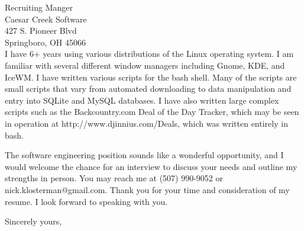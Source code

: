\documentclass{letter} %
\begin{document}
\begin{letter}{Recruiting Manger \\
Caesar Creek Software \\
427 S. Pioneer Blvd \\
Springboro, OH 45066 \\
}
\noindent 
I have 6+ years using various distributions of the Linux operating system. 
I am familiar with several different window managers including Gnome, KDE, and IceWM.
I have written various scripts for the bash shell.  
Many of the scripts are small scripts that vary from automated downloading to data manipulation and entry into SQLite and MySQL databases. 
I have also written large complex scripts such as the Backcountry.com Deal of the Day Tracker, which may be seen in operation at http://www.djinnius.com/Deals,  which was written entirely in bash.


 
\noindent 
The software engineering position sounds like a wonderful opportunity, and I would welcome the chance for an interview to discuss your needs and outline my strengths in person. 
You may reach me at (507) 990-9052 or nick.klosterman@gmail.com.
Thank you for your time and consideration of my resume. I look forward to speaking with you.
 

\closing{Sincerely yours,} 
 

 

\end{letter}
 
\end{document}
